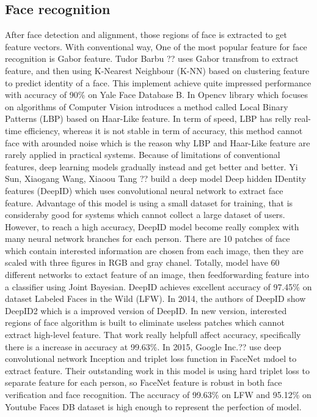 \documentclass[journal, twocolumn]{IEEEtran}
\begin{document}
\subsection{Face recognition}
After face detection and alignment, those regions of face is extracted to get feature vectors. With conventional way, One of the most popular feature for face recognition is Gabor feature. Tudor Barbu ?? uses Gabor transfrom to extract feature, and then using K-Nearest Neighbour (K-NN) based on clustering feature to predict identity of a face. This implement achieve quite impressed performance with accuracy of 90\% on Yale Face Database B. In Opencv library which focuses on algorithms of Computer Vision introduces a method called Local Binary Patterns (LBP) based on Haar-Like feature. In term of speed, LBP has relly real-time efficiency, whereas it is not stable in term of accuracy, this method cannot face with arounded noise which is the reason why LBP and Haar-Like feature are rarely applied in practical systems. Because of limitations of conventional features,  deep learning models gradually instead and get better and better. Yi Sun, Xiaogang Wang, Xiaoou Tang ?? build a deep model Deep hidden IDentity features (DeepID) which uses convolutional neural network to extract face feature. Advantage of this model is using a small dataset for training, that is consideraby good for systems which cannot collect a large dataset of users. However, to reach a high accuracy, DeepID model become really complex with many neural network branches for each person. There are 10 patches of face which contain interested information are chosen from each image, then they are scaled with three figures in RGB and gray chanel. Totally, model have 60 different networks to extact feature of an image, then feedforwarding feature into a classifier using Joint Bayesian. DeepID achieves excellent accuracy of 97.45\% on dataset Labeled Faces in the
Wild (LFW). In 2014, the authors of DeepID show DeepID2 which is a improved version of DeepID. In new version, interested regions of face algorithm is built to eliminate useless patches which cannot extract high-level feature. That work really helpfull affect accuracy, specifically there is a increase in accuracy at 99.63\%. In 2015, Google Inc.?? use deep convolutional network Inception and triplet loss function in FaceNet mdoel to extract feature. Their outstanding work in this model is using hard triplet loss to separate feature for each person, so FaceNet feature is robust in both face verification and face recognition. The accuracy of 99.63\% on LFW and 95.12\% on Youtube Faces
DB dataset is high enough to represent the perfection of model.
\end{document}
